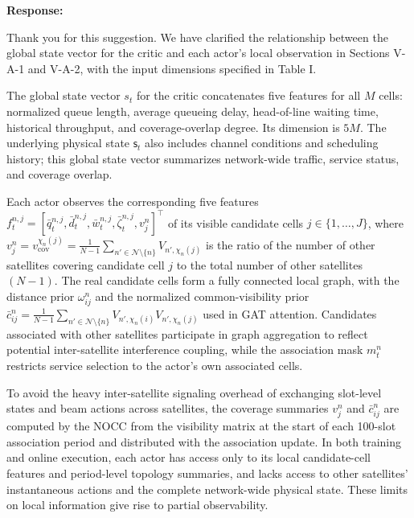 \documentclass[11pt,a4paper]{article}
\newcommand{\qrev}[1]{{\color{qinrev}#1}}
\begin{document}
\textbf{Response:}\par

Thank you for this suggestion. We have clarified the relationship between the \qrev{global state vector for the critic} and each actor's local observation in Sections V-A-1 and V-A-2, with the input dimensions specified in Table I.
\par

The \qrev{global state vector $s_t$ for the critic} concatenates five features for all $M$ cells: normalized queue length, average queueing delay, head-of-line waiting time, historical throughput, and coverage-overlap degree. Its dimension is $5M$. The underlying physical state $\mathsf{s}_t$ also includes channel conditions and scheduling history; \qrev{this global state vector} summarizes network-wide traffic, service status, and coverage overlap.
\par

Each actor observes the corresponding five features $f_t^{n,j}=[\bar q_t^{n,j},\bar d_t^{n,j},\bar w_t^{n,j},\bar\zeta_t^{n,j},v_j^n]^\top$ of its visible candidate cells $j\in\{1,\ldots,J\}$, where $v_j^n=v_{\mathrm{cov}}^{\chi_n(j)}=\frac{1}{N-1}\sum_{n'\in\mathcal N\setminus\{n\}}V_{n',\chi_n(j)}$ is the ratio of the number of other satellites covering candidate cell $j$ to the total number of other satellites $(N-1)$. The real candidate cells form a fully connected local graph, with the distance prior $\omega_{ij}^n$ and the normalized common-visibility prior \qrev{$\bar c_{ij}^n=\frac{1}{N-1}\sum_{n'\in\mathcal N\setminus\{n\}}V_{n',\chi_n(i)}V_{n',\chi_n(j)}$} used in GAT attention. Candidates associated with other satellites participate in graph aggregation to reflect potential inter-satellite interference coupling, while the association mask $m_t^n$ restricts service selection to the actor's own associated cells.
\par

To avoid the heavy inter-satellite signaling overhead of exchanging slot-level states and beam actions across satellites, the coverage summaries $v_j^n$ and $\bar c_{ij}^n$ are computed by the NOCC from the visibility matrix at the start of each 100-slot association period and distributed with the association update. \qrev{In both training and online execution}, each actor has access only to its local candidate-cell features and period-level topology summaries, and lacks access to other satellites' instantaneous actions and the complete network-wide physical state. These limits on local information give rise to partial observability.
\par
\end{document}

